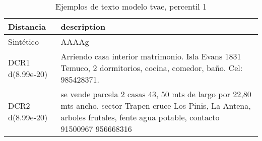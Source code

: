 \begin{table}[H]
\centering
\fontsize{10}{14}\selectfont
\caption{Ejemplos de texto modelo tvae, percentil 1}
\label{table-example-economicos-b-1-tvae-1p-text}
\begin{tabular}{|l|m{35em}|}
\hline
\rowcolor[gray]{0.8}
Distancia & description \\
\hline Sintético & AAAAg \\
\hline DCR1 d(8.99e-20) & Arriendo casa interior matrimonio. Isla Evans 1831 Temuco, 2 dormitorios, cocina, comedor, ba\~no. Cel: 985428371. \\
\hline DCR2 d(8.99e-20) & se vende parcela 2 casas 43, 50 mts de largo por 22,80 mts ancho, sector Trapen cruce Los Pinis, La Antena, arboles frutales, fente agua potable, contacto 91500967 956668316 \\
\hline
\end{tabular}
\end{table}
